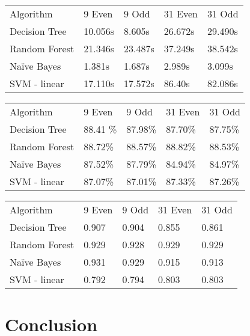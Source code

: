 \documentclass[aps, reprint, amsmath, amssymb]{revtex4-1}
\begin{document}
\begin{center}
  \begin{tabular}{ | l || l | l | l | l |}
    \hline
    Algorithm & 9 Even & 9 Odd & 31 Even & 31 Odd \\ \hhline{|=||=|=|=|=|}
    Decision Tree & 10.056s & 8.605s & 26.672s & 29.490s \\ \hline
    Random Forest & 21.346s & 23.487s & 37.249s & 38.542s \\ \hline
    Na{\"i}ve Bayes & 1.381s & 1.687s & 2.989s & 3.099s \\ \hline
    SVM - linear & 17.110s & 17.572s & 86.40s & 82.086s \\ \hline
    \hline
  \end{tabular}
\end{center}


\begin{center}
  \begin{tabular}{ | l || l | l | l | l |}
    \hline
    Algorithm & 9 Even & 9 Odd & 31 Even & 31 Odd \\ \hhline{|=||=|=|=|=|}

    Decision Tree & 88.41 \% & 87.98\% & 87.70\% & 87.75\% \\ \hline

    Random Forest & 88.72\% & 88.57\% &  88.82\% & 88.53\% \\ \hline

    Na{\"i}ve Bayes & 87.52\% & 87.79\% & 84.94\% & 84.97\% \\ \hline

    SVM - linear & 87.07\% & 87.01\% & 87.33\% & 87.26\% \\ \hline
    \hline
  \end{tabular}
\end{center}

\begin{center}
  \begin{tabular}{ | l || l | l | l | l |}
    \hline
    Algorithm & 9 Even & 9 Odd & 31 Even & 31 Odd \\ \hhline{|=||=|=|=|=|}

    Decision Tree & 0.907 & 0.904 & 0.855 & 0.861 \\ \hline

    Random Forest & 0.929 & 0.928  & 0.929  & 0.929 \\ \hline

    Na{\"i}ve Bayes & 0.931  & 0.929 & 0.915 & 0.913 \\ \hline

    SVM - linear & 0.792 & 0.794 & 0.803 & 0.803 \\ \hline
    \hline
  \end{tabular}
\end{center}



\section{Conclusion}
\end{document}
